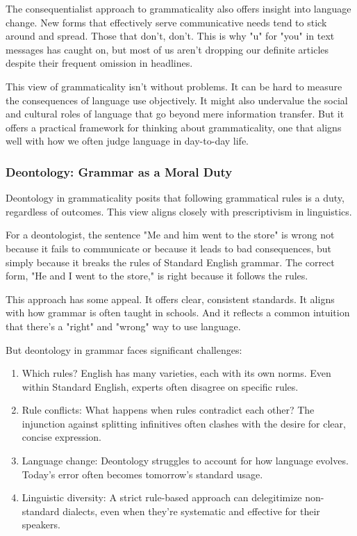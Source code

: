 The consequentialist approach to grammaticality also offers insight into language change. New forms that effectively serve communicative needs tend to stick around and spread. Those that don't, don't. This is why "u" for "you" in text messages has caught on, but most of us aren't dropping our definite articles despite their frequent omission in headlines.

This view of grammaticality isn't without problems. It can be hard to measure the consequences of language use objectively. It might also undervalue the social and cultural roles of language that go beyond mere information transfer. But it offers a practical framework for thinking about grammaticality, one that aligns well with how we often judge language in day-to-day life.

\subsubsection{Deontology: Grammar as a Moral Duty}

Deontology in grammaticality posits that following grammatical rules is a duty, regardless of outcomes. This view aligns closely with prescriptivism in linguistics.

For a deontologist, the sentence "Me and him went to the store" is wrong not because it fails to communicate or because it leads to bad consequences, but simply because it breaks the rules of Standard English grammar. The correct form, "He and I went to the store," is right because it follows the rules.

This approach has some appeal. It offers clear, consistent standards. It aligns with how grammar is often taught in schools. And it reflects a common intuition that there's a "right" and "wrong" way to use language.

But deontology in grammar faces significant challenges:

\begin{enumerate}
    \item Which rules? English has many varieties, each with its own norms. Even within Standard English, experts often disagree on specific rules.

    \item Rule conflicts: What happens when rules contradict each other? The injunction against splitting infinitives often clashes with the desire for clear, concise expression.

    \item Language change: Deontology struggles to account for how language evolves. Today's error often becomes tomorrow's standard usage.

    \item Linguistic diversity: A strict rule-based approach can delegitimize non-standard dialects, even when they're systematic and effective for their speakers.
\end{enumerate}

